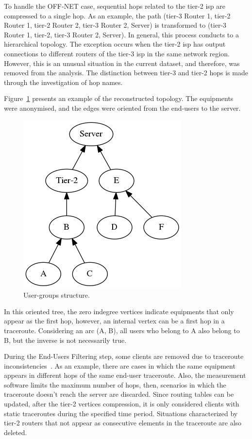To handle the OFF-NET case, sequential hops related to
the tier-2 \gls*{isp} are compressed to a single hop.
As an example, the path (tier-3 Router 1, tier-2 Router 1, tier-2 Router 2,
tier-3 Router 2, Server) is
transformed to (tier-3 Router 1, tier-2, tier-3 Router 2, Server).
In general, this process conducts to a hierarchical topology.
The exception occurs when the tier-2 \gls*{isp} has output connections to
different routers of the tier-3 \gls*{isp} in the same network region.
However, this is an unusual situation in
the current dataset, and therefore, was removed from the analysis.
The distinction between
tier-3 and tier-2 hops is made through the investigation of hop names.

Figure~\ref{fig:real_graph} presents an example of the reconstructed
topology. The equipments were anonymised, and the edges were oriented from the
end-users to the server.

\begin{figure}[H]
    \centering
    \includegraphics[width=0.35\linewidth]{./figures/methodology/spatial_correlation/dtstart2016-05-01_dtend2016-05-11_NRIDTCLDM031_graph_anonymized.png}
    \caption{User-groups structure.}
\label{fig:real_graph}
\end{figure}%

In this oriented tree, the zero
indegree vertices indicate equipments that only appear as the first hop,
however, an internal vertex can be a first hop in a traceroute.
Considering an arc (A, B), all users who belong to A also belong to B,
but the inverse is not necessarily true.

During the End-Users Filtering step, some clients are removed due to traceroute
inconsistencies~\cite{avoiding_traceroute_anomalies_with_paris_traceroute}.
As an example, there are cases in which the same equipment appears in different
hops of the same end-user traceroute. Also,
the measurement software limits the maximum number of hops, then,
scenarios in which the traceroute doesn't reach the server are discarded.
Since routing tables can be updated, after the tier-2 vertices compression,
it is only considered clients with static traceroutes
during the specified time period.
Situations characterized by tier-2 routers that not appear as consecutive
elements in the traceroute are also deleted.

